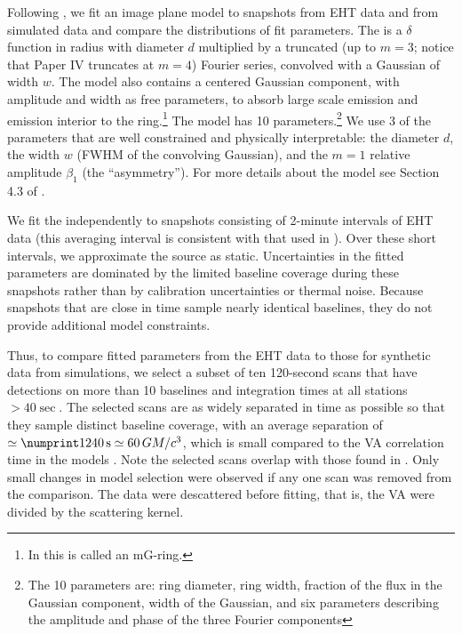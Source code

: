Following , we fit an \mring image plane model to snapshots from EHT data and from simulated data and compare the distributions of fit parameters.  The \mring is a $\delta$ function in radius with diameter $d$ multiplied by a truncated (up to $m = 3$; notice that Paper IV truncates at $m = 4$) Fourier series, convolved with a Gaussian of width $w$.
The model also contains a centered Gaussian component, with amplitude and width as free parameters, to absorb large scale emission and emission interior to the ring.\footnote{In  this is called an mG-ring.}
The \mring model has 10 parameters.\footnote{The 10 parameters are: ring diameter, ring width, fraction of the flux in the Gaussian component, width of the Gaussian, and six parameters describing the amplitude and phase of the three Fourier components} We use 3 of the parameters that are well constrained and physically interpretable: the \mring diameter $d$,
the \mring width $w$ (FWHM of the convolving Gaussian), and the $m=1$ relative amplitude $\beta_1$ (the ``asymmetry'').  For more details about the \mring model see Section 4.3 of .

We fit the \mring independently to snapshots consisting of 2-minute intervals of EHT data (this averaging interval is consistent with that used in ).
Over these short intervals, we approximate the source as static.
Uncertainties in the fitted \mring parameters are dominated by the limited baseline coverage during these snapshots rather than by calibration uncertainties or thermal noise.
Because snapshots that are close in time sample nearly identical baselines, they do not provide additional model constraints.

Thus, to compare fitted \mring parameters from the EHT data to those for synthetic data from simulations, we select a subset of ten 120-second scans  that have detections on more than 10 baselines and integration times at all stations $> 40\sec$.
The selected scans are as widely separated in time as possible so that they sample distinct baseline coverage, with an average separation of $\simeq \no{1240}\sec \simeq 60 \,\tg$, which is small compared to the VA correlation time in the models \citep{Georgiev_2022}.
Note the selected scans overlap with those found in \citep{Farah_2022}.
Only small changes in model selection were observed if any one scan was removed from the comparison.
The data were descattered before fitting, that is, the VA were divided by the scattering kernel.

